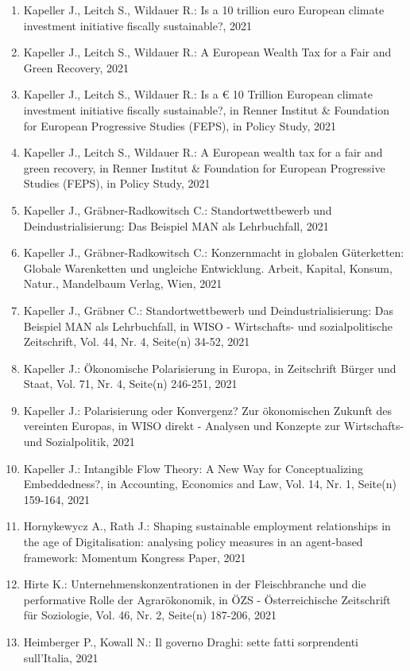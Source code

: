 \begin{enumerate}
	 \item Kapeller J., Leitch S., Wildauer R.: Is a 10 trillion euro European climate investment initiative fiscally sustainable?, 2021
	 \item Kapeller J., Leitch S., Wildauer R.: A European Wealth Tax for a Fair and Green Recovery, 2021
	 \item Kapeller J., Leitch S., Wildauer R.: Is a € 10 Trillion European climate investment initiative fiscally sustainable?, in Renner Institut \& Foundation for European Progressive Studies (FEPS), in Policy Study, 2021
	 \item Kapeller J., Leitch S., Wildauer R.: A European wealth tax for a fair and green recovery, in Renner Institut \& Foundation for European Progressive Studies (FEPS), in Policy Study, 2021
	 \item Kapeller J., Gräbner-Radkowitsch C.: Standortwettbewerb und Deindustrialisierung: Das Beispiel MAN als Lehrbuchfall, 2021
	 \item Kapeller J., Gräbner-Radkowitsch C.: Konzernmacht in globalen Güterketten: Globale Warenketten und ungleiche Entwicklung. Arbeit, Kapital, Konsum, Natur., Mandelbaum Verlag, Wien, 2021
	 \item Kapeller J., Gräbner C.: Standortwettbewerb und Deindustrialisierung: Das Beispiel MAN als Lehrbuchfall, in WISO - Wirtschafts- und sozialpolitische Zeitschrift, Vol. 44, Nr. 4, Seite(n) 34-52, 2021
	 \item Kapeller J.: Ökonomische Polarisierung in Europa, in Zeitschrift Bürger und Staat, Vol. 71, Nr. 4, Seite(n) 246-251, 2021
	 \item Kapeller J.: Polarisierung oder Konvergenz? Zur ökonomischen Zukunft des vereinten Europas, in WISO direkt - Analysen und Konzepte zur Wirtschafts- und Sozialpolitik, 2021
	 \item Kapeller J.: Intangible Flow Theory: A New Way for Conceptualizing Embeddedness?, in Accounting, Economics and Law, Vol. 14, Nr. 1, Seite(n) 159-164, 2021
	 \item Hornykewycz A., Rath J.: Shaping sustainable employment relationships in the age of Digitalisation: analysing policy measures in an agent-based framework: Momentum Kongress Paper, 2021
	 \item Hirte K.: Unternehmenskonzentrationen in der Fleischbranche und die performative Rolle der Agrarökonomik, in ÖZS - Österreichische Zeitschrift für Soziologie, Vol. 46, Nr. 2, Seite(n) 187-206, 2021
	 \item Heimberger P., Kowall N.: Il governo Draghi: sette fatti sorprendenti sull’Italia, 2021

\end{enumerate}
